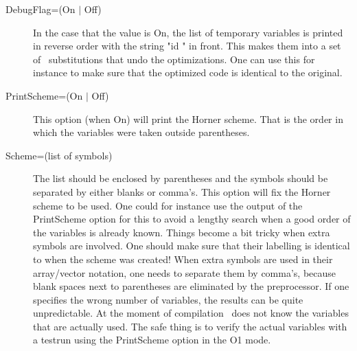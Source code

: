\begin{description}
\item[DebugFlag=(On $|$ Off)] 
In the case that the value is On, the list of temporary variables is 
printed in reverse order with the string "id " in front. This makes 
them into a set of \FORM\ substitutions that undo the optimizations. One 
can use this for instance to make sure that the optimized code is identical 
to the original.
\item[PrintScheme=(On $|$ Off)]
This option (when On) will print the Horner scheme. That is the order in 
which the variables were taken outside parentheses.
\item[Scheme=(list of symbols)] The list should be enclosed by parentheses 
and the symbols should be separated by either blanks or comma's. This 
option will fix the Horner scheme to be used. One 
could for instance use the output of the PrintScheme option for this to 
avoid a lengthy search when a good order of the variables is already known. 
Things become a bit tricky when extra symbols are involved. One should make 
sure that their labelling is identical to when the scheme was created! When 
extra symbols are used in their array/vector notation, one needs to 
separate them by comma's, because blank spaces next to parentheses are 
eliminated by the preprocessor. If one specifies the wrong number of 
variables, the results can be quite unpredictable. At the moment of 
compilation \FORM\ does not know the variables that are actually used. The 
safe thing is to verify the actual variables with a testrun using the 
PrintScheme option in the O1 mode.
\end{description}

